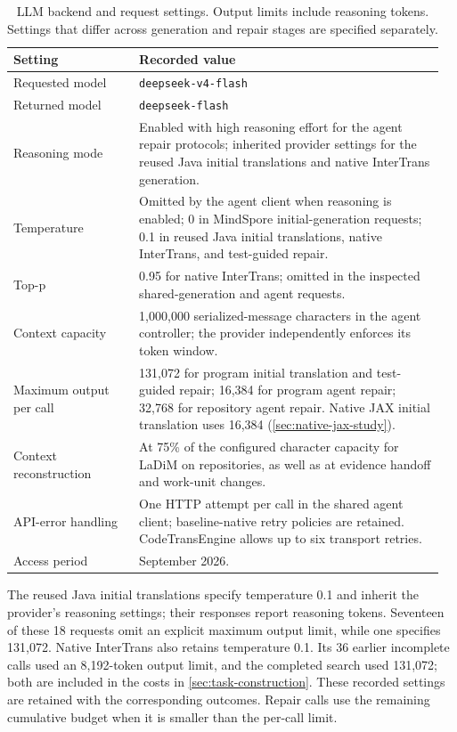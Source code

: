 \begin{table}[!htb]
\caption{LLM backend and request settings. Output limits include reasoning tokens. Settings that differ across generation and repair stages are specified separately.}
\label{tab:llm-settings}
\centering
\small
\begin{tabular}{@{}p{0.28\linewidth}p{0.68\linewidth}@{}}
\toprule
\textbf{Setting} & \textbf{Recorded value} \\
\midrule
Requested model & \texttt{deepseek-v4-flash} \\
Returned model & \texttt{deepseek-flash} \\
Reasoning mode & Enabled with high reasoning effort for the agent repair protocols; inherited provider settings for the reused Java initial translations and native InterTrans generation. \\
Temperature & Omitted by the agent client when reasoning is enabled; 0 in MindSpore initial-generation requests; 0.1 in reused Java initial translations, native InterTrans, and test-guided repair. \\
Top-p & 0.95 for native InterTrans; omitted in the inspected shared-generation and agent requests. \\
Context capacity & 1,000,000 serialized-message characters in the agent controller; the provider independently enforces its token window. \\
Maximum output per call & 131,072 for program initial translation and test-guided repair; 16,384 for program agent repair; 32,768 for repository agent repair. Native JAX initial translation uses 16,384 (\cref{sec:native-jax-study}). \\
Context reconstruction & At 75\% of the configured character capacity for LaDiM on repositories, as well as at evidence handoff and work-unit changes. \\
API-error handling & One HTTP attempt per call in the shared agent client; baseline-native retry policies are retained. CodeTransEngine allows up to six transport retries. \\
Access period & September 2026. \\
\bottomrule
\end{tabular}
\end{table}

The reused Java initial translations specify temperature 0.1 and inherit the provider's reasoning settings; their responses report reasoning tokens. Seventeen of these 18 requests omit an explicit maximum output limit, while one specifies 131,072. Native InterTrans also retains temperature 0.1. Its 36 earlier incomplete calls used an 8,192-token output limit, and the completed search used 131,072; both are included in the costs in \cref{sec:task-construction}. These recorded settings are retained with the corresponding outcomes. Repair calls use the remaining cumulative budget when it is smaller than the per-call limit.
